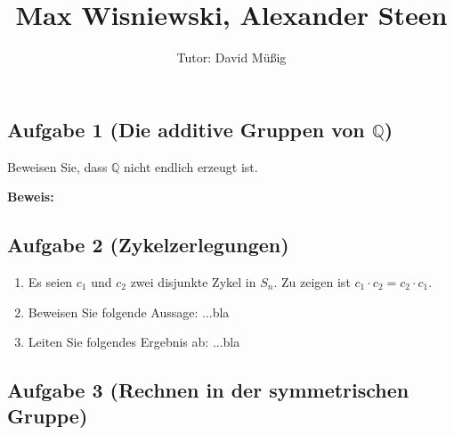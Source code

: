 \documentclass[11pt,a4paper,ngerman]{article}
\author{Tutor: David Müßig}
\date{}
\title{Max Wisniewski, Alexander Steen}
\newcommand{\Q}{\mathbb{Q}}
\begin{document}

\maketitle
\thispagestyle{fancy}


\subsection*{Aufgabe 1 \mdseries (Die additive Gruppen von $\Q$)}
Beweisen Sie, dass $\Q$ nicht endlich erzeugt ist.

\textbf{Beweis:}\\


\subsection*{Aufgabe 2 \mdseries (Zykelzerlegungen)}

\begin{enumerate}[\bfseries a)]
\item Es seien $c_1$ und $c_2$ zwei disjunkte Zykel in $S_n$. Zu zeigen ist $c_1 \cdot c_2 = c_2 \cdot c_1$.

\item Beweisen Sie folgende Aussage: ...bla

\item Leiten Sie folgendes Ergebnis ab: ...bla
\end{enumerate}



\subsection*{Aufgabe 3 \mdseries (Rechnen in der symmetrischen Gruppe)}
\end{document}
